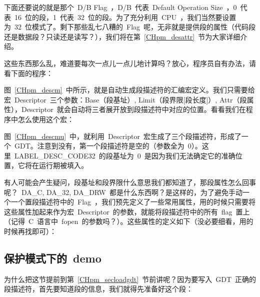 下面还要说的就是那个~D/B Flag~，D/B~代表~Default Operation Size~，0~代表~16~位的段，1~代表~32~位的段。为了充分利用~CPU~，我们当然要设置为~32~位模式了。剩下那些乱七八糟的~Flag~呢，无非就是提供段的属性（代码段还是数据段？只读还是读写？），我们将在第~\ref{CHpm_desattr}~节为大家详细介绍。

这些东西那么乱，难道要每次一点儿一点儿地计算吗？放心，程序员自有办法，请看下面的程序：

\label{CHpm_descm}

图~\ref{CHpm_descm}~中所示，就是自动生成段描述符的汇编宏定义。我们只需要给宏~Descriptor~三个参数：Base（段基址）, Limit（段界限[段长度]）, Attr（段属性），Descriptor~就会自动将三者展开放到段描述符中对应的位置。看看我们在程序中怎么使用这个宏：

\label{CHpm_descmu}

图~\ref{CHpm_descmu}~中，就利用~Descriptor~宏生成了三个段描述符，形成了一个~GDT。注意到没有，第一个段描述符是空的（参数全为~0）。这里~LABEL\_DESC\_CODE32~的段基址为~0~是因为我们无法确定它的准确位置，它将在运行期被填入。

有人可能会产生疑问，段基址和段界限什么意思我们都知道了，那段属性怎么回事呢？~DA\_C, DA\_32, DA\_DRW~都是什么东西啊？是这样的，为了避免手动一个一个置段描述符中的~Flag~，我们预先定义了一些常用属性，用的时候只需要将这些属性加起来作为宏~Descriptor~的参数，就能将段描述符中的所有~flag~置上（记得~C~语言中~fopen~的参数吗？）。这些属性的定义如下（没必要细看，用的时候再找即可）：

\label{CHpm_segattr}

\subsection{保护模式下的~demo}

为什么把这节提前到第~\ref{CHpm_secloadgdt}~节前讲呢？因为要写入~GDT~正确的段描述符，首先要知道段的信息，我们就得先准备好这个段：

